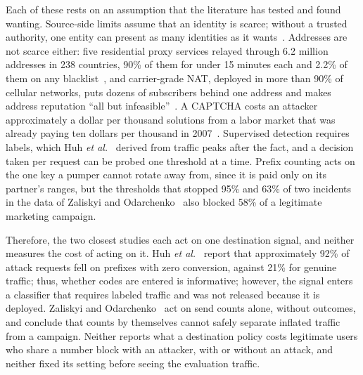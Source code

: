 \documentclass{IEEEoj}
\begin{document}
Each of these rests on an assumption that the literature has tested and found wanting. Source-side limits assume that an identity is scarce; without a trusted authority, one entity can present as many identities as it wants~\cite{douceur2002sybil}. Addresses are not scarce either: five residential proxy services relayed through 6.2 million addresses in 238 countries, 90\% of them for under 15 minutes each and 2.2\% of them on any blacklist~\cite{mi2019resip}, and carrier-grade NAT, deployed in more than 90\% of cellular networks, puts dozens of subscribers behind one address and makes address reputation ``all but infeasible''~\cite{richter2016cgn}. A CAPTCHA costs an attacker approximately a dollar per thousand solutions from a labor market that was already paying ten dollars per thousand in 2007~\cite{motoyama2010captcha}. Supervised detection requires labels, which Huh \textit{et al.}~\cite{huh2025ait} derived from traffic peaks after the fact, and a decision taken per request can be probed one threshold at a time. Prefix counting acts on the one key a pumper cannot rotate away from, since it is paid only on its partner's ranges, but the thresholds that stopped 95\% and 63\% of two incidents in the data of Zaliskyi and Odarchenko~\cite{zaliskyi2026ait} also blocked 58\% of a legitimate marketing campaign.

Therefore, the two closest studies each act on one destination signal, and neither measures the cost of acting on it. Huh \textit{et al.}~\cite{huh2025ait} report that approximately 92\% of attack requests fell on prefixes with zero conversion, against 21\% for genuine traffic; thus, whether codes are entered is informative; however, the signal enters a classifier that requires labeled traffic and was not released because it is deployed. Zaliskyi and Odarchenko~\cite{zaliskyi2026ait} act on send counts alone, without outcomes, and conclude that counts by themselves cannot safely separate inflated traffic from a campaign. Neither reports what a destination policy costs legitimate users who share a number block with an attacker, with or without an attack, and neither fixed its setting before seeing the evaluation traffic.
\end{document}
